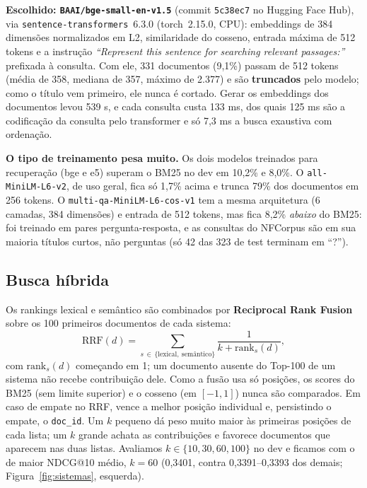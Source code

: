 \documentclass[10pt,a4paper]{article}
\begin{document}
\textbf{Escolhido: \texttt{BAAI/\allowbreak bge-small-en-v1.5}} (commit \texttt{5c38ec7} no Hugging Face Hub), via \texttt{sentence-\allowbreak transformers}~6.3.0 (torch~2.15.0, CPU): embeddings de 384 dimensões normalizados em L2, similaridade do cosseno, entrada máxima de 512 tokens e a instrução \emph{``Represent this sentence for searching relevant passages:''} prefixada à consulta. Com ele, 331 documentos (9,1\%) passam de 512 tokens (média de 358, mediana de 357, máximo de 2.377) e são \textbf{truncados} pelo modelo; como o título vem primeiro, ele nunca é cortado. Gerar os embeddings dos documentos levou 539 s, e cada consulta custa 133 ms, dos quais 125 ms são a codificação da consulta pelo transformer e só 7,3 ms a busca exaustiva com ordenação.

\textbf{O tipo de treinamento pesa muito.} Os dois modelos treinados para recuperação (bge e e5) superam o BM25 no dev em 10,2\% e 8,0\%. O \texttt{all-MiniLM-L6-v2}, de uso geral, fica só 1,7\% acima e trunca 79\% dos documentos em 256 tokens. O \texttt{multi-qa-MiniLM-L6-cos-v1} tem a mesma arquitetura (6 camadas, 384 dimensões) e entrada de 512 tokens, mas fica 8,2\% \emph{abaixo} do BM25: foi treinado em pares pergunta-resposta, e as consultas do NFCorpus são em sua maioria títulos curtos, não perguntas (só 42 das 323 de test terminam em ``?'').

\subsection{Busca híbrida}

Os rankings lexical e semântico são combinados por \textbf{Reciprocal Rank Fusion} sobre os 100 primeiros documentos de cada sistema:
\[
\mathrm{RRF}(d) = \sum_{s \,\in\, \{\text{lexical},\ \text{semântico}\}} \frac{1}{k + \mathrm{rank}_s(d)},
\]
com $\mathrm{rank}_s(d)$ começando em 1; um documento ausente do Top-100 de um sistema não recebe contribuição dele. Como a fusão usa só posições, os scores do BM25 (sem limite superior) e o cosseno (em $[-1, 1]$) nunca são comparados. Em caso de empate no RRF, vence a melhor posição individual e, persistindo o empate, o \texttt{doc\_id}. Um $k$ pequeno dá peso muito maior às primeiras posições de cada lista; um $k$ grande achata as contribuições e favorece documentos que aparecem nas duas listas. Avaliamos $k \in \{10, 30, 60, 100\}$ no dev e ficamos com o de maior NDCG@10 médio, \textbf{$k = 60$} (0,3401, contra 0,3391--0,3393 dos demais; Figura~\ref{fig:sistemas}, esquerda).
\end{document}
